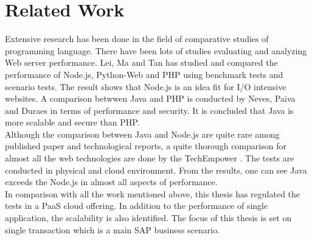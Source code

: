 \chapter{Related Work}
Extensive research has been done in the field of comparative studies of programming language. There have been lots of studies evaluating and analyzing Web server performance. Lei, Ma and Tan has studied and compared the performance of Node.js, Python-Web and PHP using benchmark tests and scenario tests\citep{node-related}. The result shows that Node.js is an idea fit for I/O intensive websites. A comparison betwwen Java and PHP is conducted by Neves, Paiva and Duraes in terms of performance and security\citep{java-related}. It is concluded that Java is more scalable and secure than PHP. \\
Although the comparison between Java and Node.js are quite rare among published paper and technological reports, a quite thorough comparison for almost all the web technologies are done by the TechEmpower \cite{Benchmark}. The tests are conducted in physical and cloud environment. From the results, one can see Java exceeds the Node.js in almost all aspects of performance. \\
In comparison with all the work mentioned above, this thesis has regulated the tests in a PaaS cloud offering. In addition to the performance of single application, the scalability is also identified. The focus of this thesis is set on single transaction which is a main SAP business scenario. 